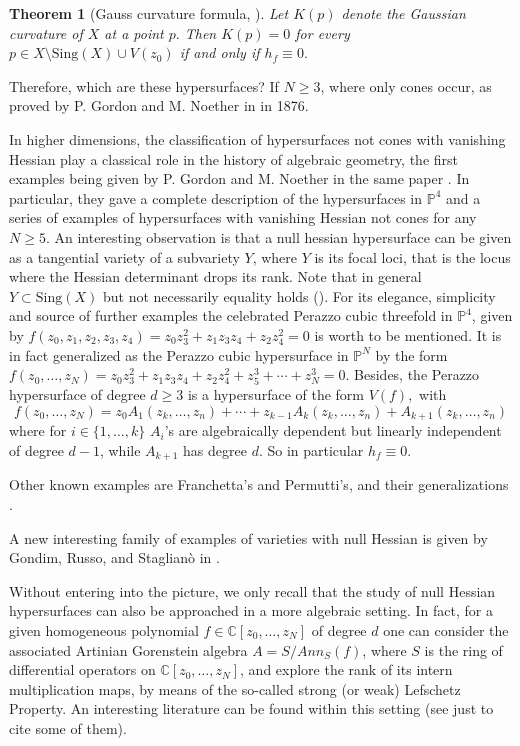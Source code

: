 \documentclass[letterpaper,11pt]{amsart}
\theoremstyle{plain}
\newtheorem*{theorem*}{Theorem}
\theoremstyle{definition}
\newcommand{\enm}[1]{\ensuremath{#1}}          %
\newcommand{\Sing}{\enm{\mathrm{Sing}}}
\begin{document}
\begin{theorem*}[Gauss curvature formula, {{\cite[Proposition 7.2.3]{R16}}}]
Let $K(p)$ denote the Gaussian curvature of $X$ at a point $p.$ Then $K(p)=0$ for every $p \in X \setminus \mathrm{Sing}(X) \cup V(z_0)$ if and only if $h_f \equiv 0.$ 
\end{theorem*}


Therefore, which are these hypersurfaces?
If 
 $N\geq 3$, where only cones occur, as  proved by P. Gordon and M. Noether in \cite{GN} in 1876. 
 
 In higher dimensions, the classification of
hypersurfaces not cones with vanishing Hessian play a classical role in the history of algebraic geometry, the first examples being given by P. Gordon and M. Noether in the same paper \cite{GN}. In particular, they gave a complete description of the hypersurfaces in $\mathbb{P}^4$ and a series of examples of hypersurfaces with vanishing Hessian not
cones for any $N\geq 5$. 
An interesting observation is that a null hessian hypersurface can be given as a tangential variety of a subvariety $Y$, where $Y$ is its focal loci, that is the locus where the Hessian determinant drops its rank. Note that in general $Y\subset\Sing (X)$ but not necessarily equality holds (\cite{R16}). 
For its elegance, simplicity and source of further examples the celebrated  Perazzo cubic threefold in $\mathbb{P}^4$, given by  $f (z_0, z_1, z_2, z_3, z_4) = z_0z_3^2+ z_1z_3z_4 + z_2z_4^2=0$ \cite{Pe}
is worth to be mentioned. It is in fact generalized as the 
Perazzo cubic hypersurface in $\mathbb{P}^N$ by the form $f (z_0,\dots,z_N) = z_0z_3^2+ z_1z_3z_4 + z_2z_4^2+z_5^3+\cdots +z_N^3=0$. Besides, the Perazzo hypersurface of degree $d\geq 3$ is a hypersurface of the form $V(f),$ with
$$
f(z_0,\dots,z_N)=z_0A_1(z_k,\dots,z_n)+\cdots +z_{k-1}A_k(z_k,\dots,z_n)+A_{k+1}(z_k,\dots,z_n)
$$
where for $i\in \{1,\dots,k \}$ $A_i $'s are algebraically dependent but linearly independent of degree $d-1$, while $A_{k+1}$ has degree $d$. So in particular $h_f\equiv 0$.

Other known examples are Franchetta's and Permutti's, and their generalizations \cite{CRS, Franchetta1954, G, GR, Permutti1957, Permutti1964}.

A new interesting family of examples of varieties with null Hessian is given by Gondim, Russo, and Staglianò in \cite{GRS}.

Without entering into the picture, we only recall that the study of null Hessian hypersurfaces can also be approached in a more algebraic setting. In fact,  for a given  homogeneous polynomial $f\in \mathbb{C}[z_0,\dots,z_N]$ of degree $d$ one can consider the associated Artinian Gorenstein algebra $ A =
S/ Ann_S(f)$, where $S$ is the
ring of differential operators on $\mathbb{C}[z_0,\dots,z_N]$, and explore the rank of its intern multiplication maps, by means of the so-called strong (or weak) Lefschetz Property. An interesting literature can be found within this setting (see \cite{WB, FMM, G,  MW, RP,  W} just to cite some of them).
\end{document}
